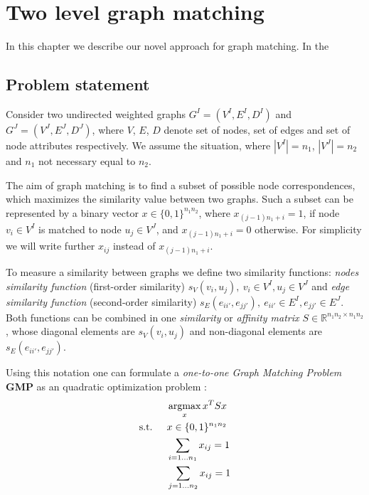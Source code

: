 \chapter{Two level graph matching} \label{chapter:2levelGM}
In this chapter we describe our novel approach for graph matching. In the 
\section{Problem statement} \label{sec:prob_stat}
Consider two undirected weighted graphs $G^I = (V^I, E^I, D^I)$ and $G^J = (V^J, E^J, D^J)$, where $V$, $E$, $D$ denote set of nodes,
set of edges and set of node attributes respectively. We assume the situation, where $|V^I|=n_1$, $|V^J|=n_2$ and $n_1$ not necessary equal to $n_2$.

The aim of graph matching is to find a subset of possible node correspondences, which maximizes the similarity value between two graphs. Such a subset can be represented by a binary vector $x\in \{0,1\}^{n_1n_2}$, where $x_{(j-1)n_1+i}=1$, if node $v_i\in V^I$ is matched to node $u_j\in V^J$, and $x_{(j-1)n_1+i}=0$ otherwise. For simplicity we will write further $x_{ij}$ instead of $x_{(j-1)n_1+i}$.

To measure a similarity between graphs we define two similarity functions: \emph{nodes similarity function} (first-order similarity) $s_V(v_i, u_j),\ v_i\in V^I, u_j\in V^J$ and \emph{edge similarity function} (second-order similarity) $s_E(e_{ii\prime}, e_{jj\prime}),\ e_{ii\prime}\in E^I, e_{jj\prime}\in E^J$. Both functions can be combined in one \emph{similarity} or \emph{affinity matrix $S\in\mathbb{R}^{n_1n_2\times n_1n_2}$}, whose diagonal elements are $s_V(v_i, u_j)$ and non-diagonal elements are $s_E(e_{ii\prime}, e_{jj\prime})$.


Using this notation one can formulate a \emph{one-to-one Graph Matching Problem} \textbf{GMP} as an quadratic optimization problem \cite{Cho2014_Haystack, Cho2010_RRWM, Cho2012_ProgressiveGM, Conte2004}: 
\begin{alignat}{2}
    &     && \mathop{\rm argmax}_x{x^TSx}                           \notag\\
    & \text{s.t. } &&  x\in \{0,1\}^{n_1n_2}            \label{QIP:2}\\
    &             &&  \sum_{i=1\dots n_1} x_{ij} = 1    \label{QIP:3}\\
    &             &&  \sum_{j=1\dots n_2} x_{ij} = 1    \label{QIP:4}
 \end{alignat}
 
